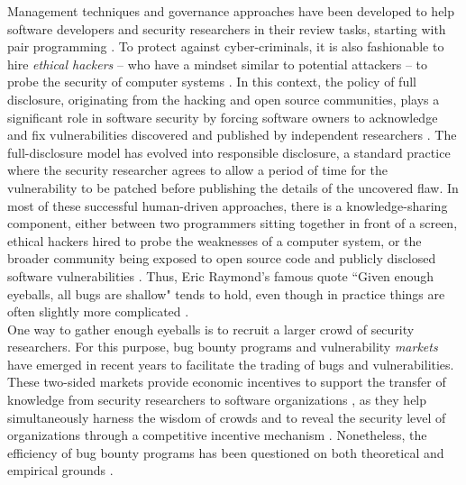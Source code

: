 Management techniques and governance approaches have been developed to help software developers and security researchers in their review tasks, starting with pair programming \cite{hulkko2005multiple}. To protect against cyber-criminals, it is also fashionable to hire {\it ethical hackers} -- who have a mindset similar to potential attackers -- to probe the security of computer systems \cite{smith2002ethical,saleem2006ethical,bishop2007penetration}. In this context, the policy of full disclosure, originating from the hacking and open source communities, plays a significant role in software security by forcing software owners to acknowledge and fix vulnerabilities discovered and published by independent researchers \cite{arora2008optimal}. The full-disclosure model has evolved into responsible disclosure, a standard practice where the security researcher agrees to allow a period of time for the vulnerability to be patched before publishing the details of the uncovered flaw. In most of these successful human-driven approaches, there is a knowledge-sharing component, either between two programmers sitting together in front of a screen, ethical hackers hired to probe the weaknesses of a computer system, or the broader community being exposed to open source code and publicly disclosed software vulnerabilities \cite{cavusoglu2007efficiency}. Thus, Eric Raymond's famous quote ``Given enough eyeballs, all bugs are shallow" \cite{raymond1999cathedral} tends to hold, even though in practice things are often slightly more complicated \cite{hafiz2015game}.\\

One way to gather enough eyeballs is to recruit a larger crowd of security researchers. For this purpose, bug bounty programs and vulnerability {\it markets} have emerged in recent years to facilitate the trading of bugs and vulnerabilities. These two-sided markets provide economic incentives to support the transfer of knowledge from security researchers to software organizations \cite{camp2004pricing}, as they help simultaneously harness the wisdom of crowds and to reveal the security level of organizations through a competitive incentive mechanism \cite{schechter2002buy}. Nonetheless, the efficiency of bug bounty programs has been questioned on both theoretical \cite{kannan2005market,mckinney2007vulnerability} and empirical grounds \cite{ransbotham2008markets,algarni2014software}.\\

